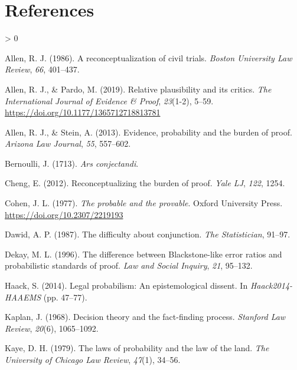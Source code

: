 \documentclass[
  10pt,
  dvipsnames,enabledeprecatedfontcommands]{scrartcl}
\newlength{\cslhangindent}
\newenvironment{CSLReferences}[2] %
 {%
  \setlength{\parindent}{0pt}
  \ifodd #1 \everypar{\setlength{\hangindent}{\cslhangindent}}\ignorespaces\fi
  \ifnum #2 > 0
  \setlength{\parskip}{#2\baselineskip}
  \fi
 }%
 {}
\begin{document}
\hypertarget{references}{%
\section*{References}\label{references}}

\hypertarget{refs}{}
\begin{CSLReferences}{1}{0}
\leavevmode\hypertarget{ref-Allen1986A-Reconceptuali}{}%
Allen, R. J. (1986). A reconceptualization of civil trials. \emph{Boston
University Law Review}, \emph{66}, 401--437.

\leavevmode\hypertarget{ref-AllenPardo2019relative}{}%
Allen, R. J., \& Pardo, M. (2019). Relative plausibility and its
critics. \emph{The International Journal of Evidence {\&} Proof},
\emph{23}(1-2), 5--59. \url{https://doi.org/10.1177/1365712718813781}

\leavevmode\hypertarget{ref-allen2013}{}%
Allen, R. J., \& Stein, A. (2013). Evidence, probability and the burden
of proof. \emph{Arizona Law Journal}, \emph{55}, 557--602.

\leavevmode\hypertarget{ref-Bernoulli1713Ars-conjectandi}{}%
Bernoulli, J. (1713). \emph{Ars conjectandi}.

\leavevmode\hypertarget{ref-cheng2012reconceptualizing}{}%
Cheng, E. (2012). Reconceptualizing the burden of proof. \emph{Yale LJ},
\emph{122}, 1254.

\leavevmode\hypertarget{ref-Cohen1977The-probable-an}{}%
Cohen, J. L. (1977). \emph{The probable and the provable}. Oxford
University Press. \url{https://doi.org/10.2307/2219193}

\leavevmode\hypertarget{ref-dawid1987difficulty}{}%
Dawid, A. P. (1987). The difficulty about conjunction. \emph{The
Statistician}, 91--97.

\leavevmode\hypertarget{ref-Dekay1996}{}%
Dekay, M. L. (1996). The difference between {B}lackstone-like error
ratios and probabilistic standards of proof. \emph{Law and Social
Inquiry}, \emph{21}, 95--132.

\leavevmode\hypertarget{ref-haack2011legal}{}%
Haack, S. (2014). Legal probabilism: An epistemological dissent. In
\emph{{Haack2014-HAAEMS}} (pp. 47--77).

\leavevmode\hypertarget{ref-Kaplan1968decision}{}%
Kaplan, J. (1968). Decision theory and the fact-finding process.
\emph{Stanford Law Review}, \emph{20}(6), 1065--1092.

\leavevmode\hypertarget{ref-kaye79}{}%
Kaye, D. H. (1979). The laws of probability and the law of the land.
\emph{The University of Chicago Law Review}, \emph{47}(1), 34--56.


\end{CSLReferences}
\end{document}
